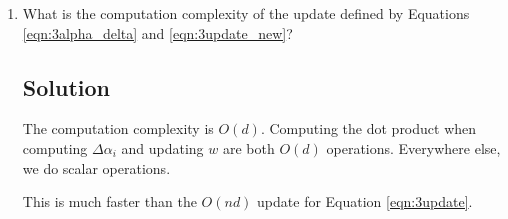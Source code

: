 \begin{enumerate}
\begin{proof}
    To see that, the update rule for $w$ is valid, we can rewrite
    \begin{equation}
      w = \frac{\alpha_1}{\lambda}x_1 + \cdots + \frac{\alpha_i}{\lambda}x_i + \cdots + \frac{\alpha_n}{\lambda}x_n,
    \end{equation}
    so
    \begin{align*}
      w^\prime
      &= w + \frac{\Delta\alpha_i}{\lambda}x_i \\
      &= \frac{\alpha_1}{\lambda}x_1 + \cdots + \frac{\alpha_i + \Delta\alpha_i}{\lambda}x_i + \cdots + \frac{\alpha_n}{\lambda}x_n \\
      &= \frac{\alpha_1}{\lambda}x_1 + \cdots + \frac{\alpha^\prime_i}{\lambda}x_i + \cdots + \frac{\alpha_n}{\lambda}x_n \\
      &= \frac{1}{\lambda}X^\intercal \alpha^\prime.
    \end{align*}
    Thus, the $w$ update is valid.

    To see that the $\alpha$ update is valid, we show that Equations
    \ref{eqn:3update} and \ref{eqn:3update_new} are equivalent. Both algorithms
    initiate $\alpha = 0$, so they are equivalent at the initial step.

    By using the definition $w = \frac{1}{\lambda}X^\intercal \alpha$,
    \begin{align*}
      \alpha_i^\prime
      &= \alpha_i + \Delta \alpha_i \\
      &= \frac{\left(y_i - w \cdot x_i\right) - \alpha_i}{
        1 + \left\lVert x_i\right\rVert^2 / \lambda} +
        \frac{\alpha_i + \alpha_i\left\lVert x_i\right\rVert^2/\lambda}{1 + \left\lVert x_i\right\rVert^2 / \lambda} \\
      &=\frac{1}{1 + \left\lVert x_i\right\rVert^2 / \lambda}
        \left(
        y_i - \frac{1}{\lambda}\left(\sum_{j \neq i} \alpha_jx_j\right) \cdot x_i
        - \frac{1}{\lambda}\alpha_i \left\lVert x_i \right\rVert^2
        + \frac{1}{\lambda}\alpha_i \left\lVert x_i \right\rVert^2
        \right) \\
      &= \frac{y_i - \frac{1}{\lambda}\left(\sum_{j \neq i} \alpha_j x_j\right) \cdot x_i}{1 + \left\lVert x_i\right\rVert^2 / \lambda},
    \end{align*}
    so both update rules are equivalent.
  \end{proof}

\item What is the computation complexity of the update defined by Equations
  \ref{eqn:3alpha_delta} and \ref{eqn:3update_new}?

  \subsection*{Solution}

  The computation complexity is $O(d)$. Computing the dot product when computing
  $\Delta\alpha_i$ and updating $w$ are both $O(d)$ operations. Everywhere else,
  we do scalar operations.

  This is much faster than the $O(nd)$ update for Equation \ref{eqn:3update}.
\end{enumerate}
